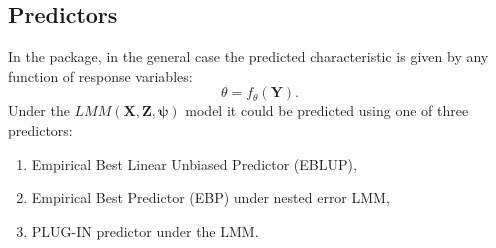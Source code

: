 \subsection{Predictors}
In the  package, in the general case the predicted characteristic  is given by any function of response variables:
\begin{equation} \label{ftheta}
\theta = f_{\theta}(\mathbf{Y}).
\end{equation}
Under the $LMM(\mathbf{X}, \mathbf{Z}, \boldsymbol{\psi})$ model it could be predicted using one of three predictors:
\begin{enumerate}
	\item Empirical Best Linear Unbiased Predictor (EBLUP),
	\item Empirical Best Predictor (EBP) under nested error LMM,
	\item PLUG-IN predictor under the LMM.
\end{enumerate}

